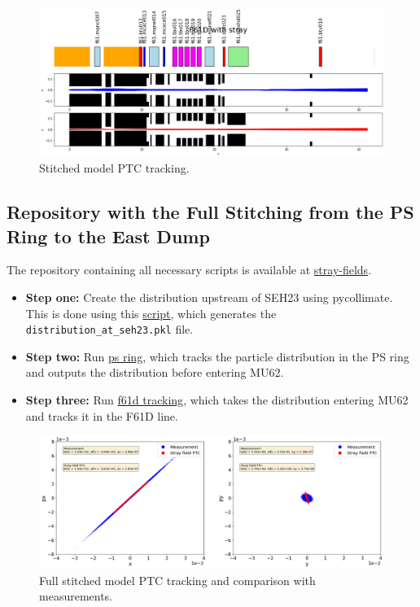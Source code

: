 \begin{figure}[H]
\centering
\includegraphics[width=1.0\textwidth]{02_Simulation/images/PTC_stray_field.png}
\caption{Stitched model PTC tracking.}
\label{fig:stitched_PTC}
\end{figure}

\subsection{Repository with the Full Stitching from the PS Ring to the East Dump}

The repository containing all necessary scripts is available at \href{https://gitlab.cern.ch/eljohnso/stray-fields}{stray-fields}.

\begin{itemize}
    \item \textbf{Step one:} Create the distribution upstream of SEH23 using pycollimate. This is done using this \href{https://gitlab.cern.ch/eljohnso/stray-fields/-/blob/master/pycollimate.ipynb}{script}, which generates the \texttt{distribution\_at\_seh23.pkl} file.
    \item \textbf{Step two:} Run \href{https://gitlab.cern.ch/eljohnso/stray-fields/-/blob/master/ps_ring.ipynb?ref_type=heads}{ps ring}, which tracks the particle distribution in the PS ring and outputs the distribution before entering MU62.
    \item \textbf{Step three:} Run \href{https://gitlab.cern.ch/eljohnso/stray-fields/-/blob/master/f61d_tracking.ipynb?ref_type=heads}{f61d tracking}, which takes the distribution entering MU62 and tracks it in the F61D line.
\end{itemize}

\begin{figure}[H]
\centering
\includegraphics[width=1.0\textwidth]{02_Simulation/images/full_stitching_PTC.png}
\caption{Full stitched model PTC tracking and comparison with measurements.}
\label{fig:full_stitched_PTC}
\end{figure}


